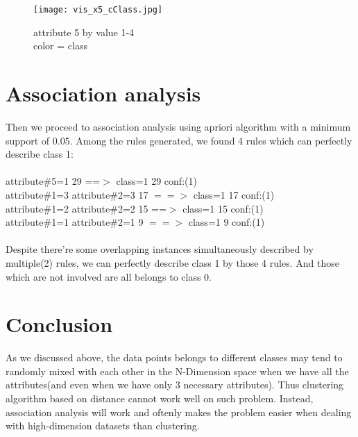 \documentclass{article}
\begin{document}
\begin{figure}[H]
\centering
\texttt{[image: vis\_x5\_cClass.jpg]}
\caption{\label{fig:vis_x5_cClass}attribute 5 by value 1-4 \\ color = class}
\end{figure}

\section{Association analysis}

Then we proceed to association analysis using apriori algorithm with a minimum support of 0.05. Among the rules generated, we found 4 rules which can perfectly describe class 1:\\
\\
attribute\#5=1 29 ==$>$ class=1 29    conf:(1)\\
attribute\#1=3 attribute\#2=3 17 $==>$ class=1 17    conf:(1)\\
attribute\#1=2 attribute\#2=2 15 ==$>$ class=1 15    conf:(1)\\
attribute\#1=1 attribute\#2=1 9 $==>$ class=1 9    conf:(1)\\
\\
Despite there’re some overlapping instances simultaneously described by multiple(2) rules, we can perfectly describe class 1 by those 4 rules. And those which are not involved are all belongs to class 0.\\

\section{Conclusion}
As we discussed above, the data points belongs to different classes may tend to randomly  mixed with each other in the N-Dimension space when we have all the attributes(and even when we have only 3 necessary attributes). Thus clustering algorithm based on distance cannot work well on such problem. Instead, association analysis will work and oftenly makes the problem easier when dealing with high-dimension datasets than clustering.
\end{document}
